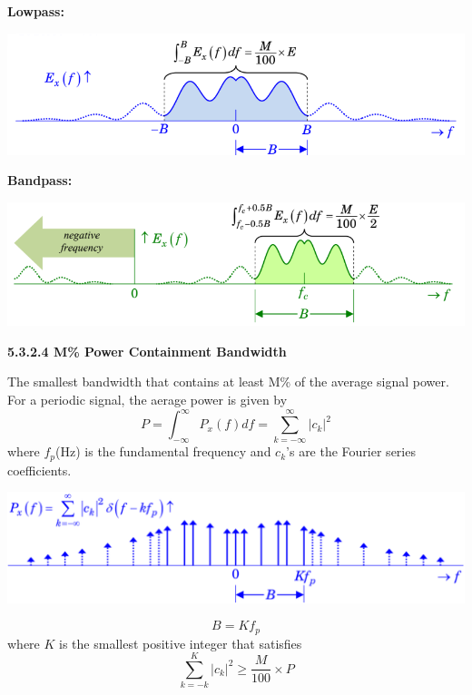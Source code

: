 \documentclass[landscape,a4paper]{extarticle}
\newenvironment{Figure}
  {\par\medskip\noindent\minipage{\linewidth}}
  {\endminipage\par\medskip}
\begin{document}
\begin{multicols*}{5}
    \textbf{Lowpass:}
    \begin{Figure}
        \centering
        \includegraphics[width=\linewidth]{../images/MPercentEnergy_lowpass.png}
    \end{Figure}
    \textbf{Bandpass:}
    \begin{Figure}
        \centering
        \includegraphics[width=\linewidth]{../images/MPercentEnergy_bandpass.png}
    \end{Figure}

    \textbf{5.3.2.4 M\% Power Containment Bandwidth}

    The smallest bandwidth that contains at least M\% of the average signal power. For a periodic signal, the aerage power is given by
    \[
        P = \int_{-\infty}^{\infty}P_x(f)df=\sum_{k=-\infty}^{\infty}|c_k|^2
    \]
    where $f_p$(Hz) is the fundamental frequency and $c_k$'s are the Fourier series coefficients.
    \begin{Figure}
        \centering
        \includegraphics[width=\linewidth]{../images/MPercentPower.png}
    \end{Figure}
    \[
        B = Kf_p
    \]
    where $K$ is the smallest positive integer that satisfies 
    \[
        \sum_{k=-k}^{K}|c_k|^2 \geq \frac{M}{100} \times P
    \]


\end{multicols*}
\end{document}

